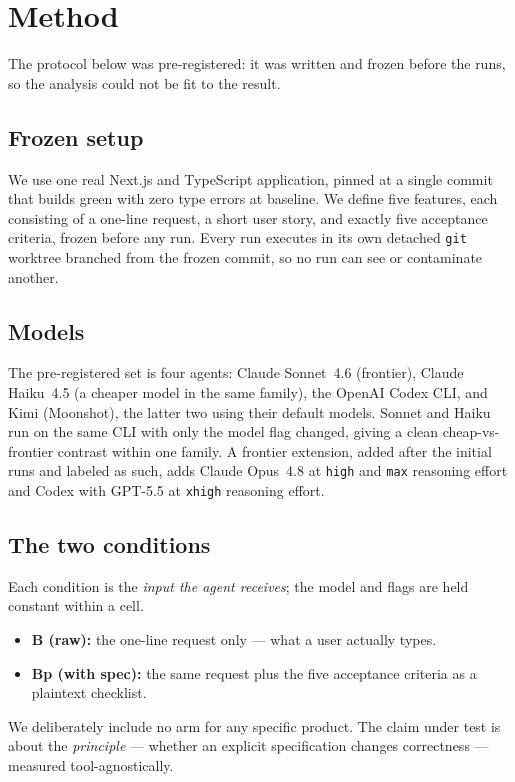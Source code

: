 \documentclass[11pt]{article}
\begin{document}
\section{Method}
\label{sec:method}

The protocol below was pre-registered: it was written and frozen before the runs, so the analysis could not be fit to the result.

\subsection{Frozen setup}
We use one real Next.js and TypeScript application, pinned at a single commit that builds green with zero type errors at baseline. We define five features, each consisting of a one-line request, a short user story, and exactly five acceptance criteria, frozen before any run. Every run executes in its own detached \texttt{git} worktree branched from the frozen commit, so no run can see or contaminate another.

\subsection{Models}
The pre-registered set is four agents: Claude Sonnet~4.6 (frontier), Claude Haiku~4.5 (a cheaper model in the same family), the OpenAI Codex CLI, and Kimi (Moonshot), the latter two using their default models. Sonnet and Haiku run on the same CLI with only the model flag changed, giving a clean cheap-vs-frontier contrast within one family. A frontier extension, added after the initial runs and labeled as such, adds Claude Opus~4.8 at \texttt{high} and \texttt{max} reasoning effort and Codex with GPT-5.5 at \texttt{xhigh} reasoning effort.

\subsection{The two conditions}
Each condition is the \emph{input the agent receives}; the model and flags are held constant within a cell.
\begin{itemize}
\item \textbf{B (raw):} the one-line request only --- what a user actually types.
\item \textbf{Bp (with spec):} the same request plus the five acceptance criteria as a plaintext checklist.
\end{itemize}
We deliberately include no arm for any specific product. The claim under test is about the \emph{principle} --- whether an explicit specification changes correctness --- measured tool-agnostically.
\end{document}
